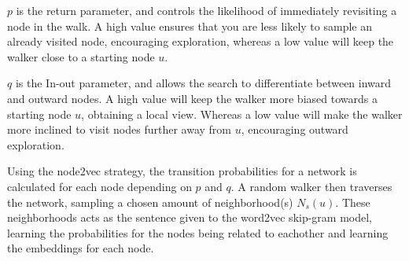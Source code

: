 $p$ is the return parameter, and controls the likelihood of immediately revisiting a node in the walk. A high value ensures that you are less likely to sample an already visited node, encouraging exploration, whereas a low value will keep the walker close to a starting node $u$.

$q$ is the In-out parameter, and allows the search to differentiate between inward and outward nodes. A high value will keep the walker more biased towards a starting node $u$, obtaining a local view. Whereas a low value will make the walker more inclined to visit nodes further away from $u$, encouraging outward exploration.

Using the node2vec strategy, the transition probabilities for a network is calculated for each node depending on $p$ and $q$. A random walker then traverses the network, sampling a chosen amount of neighborhood(s) $N_s(u)$. These neighborhoods acts as the sentence given to the word2vec skip-gram model, learning the probabilities for the nodes being related to eachother and learning the embeddings for each node.
